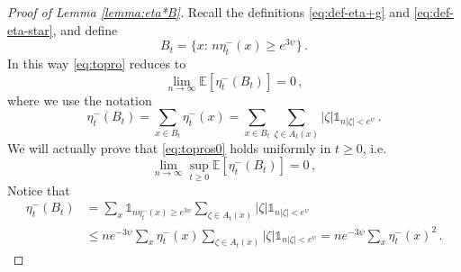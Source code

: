 \documentclass[11pt,reqno]{amsart}
\theoremstyle{remark}
\theoremstyle{definition}
\numberwithin{equation}{section}
\numberwithin{figure}{section}
\newcommand{\E}{\mathds{E}}
\newcommand{\car}{\mathds{1}}
\begin{document}
\begin{proof}[Proof of Lemma \ref{lemma:eta*B}]	Recall the definitions \eqref{eq:def-eta+g} and \eqref{eq:def-eta-star}, and define
	\begin{equation}
		B_t=\{x:\, n\eta_{t}^-(x)\ge e^{3\psi} \}\,.
	\end{equation}
	In this way \eqref{eq:topro} reduces to 
		\begin{equation}\label{eq:topros0}
			\lim_{n\to\infty}\E\left[\eta_{t}^-(B_t)\right]=0\,,
		\end{equation}
		where we use the notation 
		\begin{equation}\label{eq:zeta-B}
				\eta_t^-(B_t)=\sum_{x\in B_t}\eta^-_t(x) = \sum_{x\in B_t}\sum_{\zeta\in A_t(x)}|\zeta|\car_{n|\zeta|<e^\psi}
				\,.
				\end{equation}
We will actually prove that \eqref{eq:topros0} holds uniformly in $t\ge 0$, i.e.\
\begin{equation}\label{eq:topros}
			\lim_{n\to\infty}\sup_{t\ge 0}\E\left[\eta_{t}^-(B_t)\right]=0\,,
		\end{equation}
Notice that
		\begin{align}
				\eta_t^-(B_t)&=\sum_{x}\car_{n\eta_t^-(x)\ge e^{3\psi}}\sum_{\zeta\in A_t(x)}|\zeta|\car_{n|\zeta|< e^{\psi}}\\
				&\le ne^{-3\psi}\sum_{x}\eta_t^-(x)\sum_{\zeta\in A_t(x)}|\zeta|\car_{n|\zeta|< e^{\psi}}
				= ne^{-3\psi}\sum_{x}\eta_t^-(x)^2\,.
		\label{eq:zeta-B2}\end{align}


\end{proof}
\end{document}
